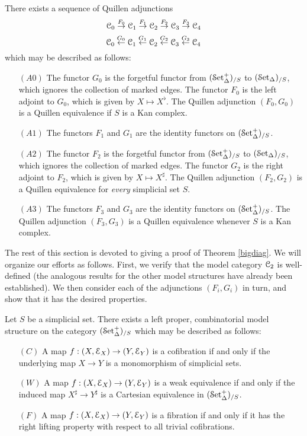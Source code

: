 \begin{theorem}\label{bigdiag}
There exists a sequence of Quillen adjunctions
$$ \operatorname{\mathcal{C}}_0 \stackrel{F_0}{\rightarrow} \operatorname{\mathcal{C}}_1 \stackrel{F_1}{\rightarrow} \operatorname{\mathcal{C}}_2
\stackrel{F_2}{\rightarrow} \operatorname{\mathcal{C}}_3 \stackrel{F_3}{\rightarrow} \operatorname{\mathcal{C}}_4$$
$$ \operatorname{\mathcal{C}}_0 \stackrel{G_0}{\leftarrow} \operatorname{\mathcal{C}}_1 \stackrel{G_1}{\leftarrow} \operatorname{\mathcal{C}}_2
\stackrel{G_2}{\leftarrow} \operatorname{\mathcal{C}}_3 \stackrel{G_3}{\leftarrow} \operatorname{\mathcal{C}}_4$$
which may be described as follows:
\begin{itemize}
\item[$(A0)$] The functor $G_0$ is the forgetful functor from $(\operatorname{\mathcal{S}et_{\Delta}^{+}})_{/S}$ to $(\operatorname{\mathcal{S}et_{\Delta}})_{/S}$, which
ignores the collection of marked edges. The functor $F_0$ is the left adjoint to $G_0$, which is given by
$X \mapsto X^{\flat}$. The Quillen adjunction $(F_0,G_0)$ is a Quillen equivalence if $S$ is a Kan complex.

\item[$(A1)$] The functors $F_1$ and $G_1$ are the identity functors on $(\operatorname{\mathcal{S}et_{\Delta}^{+}})_{/S}$.

\item[$(A2)$] The functor $F_2$ is the forgetful functor from $(\operatorname{\mathcal{S}et_{\Delta}^{+}})_{/S}$ to $(\operatorname{\mathcal{S}et_{\Delta}})_{/S}$, which ignores
the collection of marked edges. The functor $G_2$ is the right adjoint to $F_2$, which is given by
$X \mapsto X^{\sharp}$. The Quillen adjunction $(F_2,G_2)$ is a Quillen equivalence for
{\em every} simplicial set $S$.

\item[$(A3)$] The functors $F_3$ and $G_3$ are the identity functors on $(\operatorname{\mathcal{S}et_{\Delta}^{+}})_{/S}$. The Quillen
adjunction $(F_3, G_3)$ is a Quillen equivalence whenever $S$ is a Kan complex.
\end{itemize}
\end{theorem}

The rest of this section is devoted to giving a proof of Theorem \ref{bigdiag}. We will organize our efforts as follows. First, we verify that the model category $\operatorname{\mathcal{C}}_{2}$ is well-defined (the analogous results for the other model structures have already been established). We then consider each of the adjunctions $(F_i,G_i)$ in turn, and show that it has the desired properties.

\begin{proposition}\label{lmark}
Let $S$ be a simplicial set. There exists a left proper, combinatorial model structure on the category
$(\operatorname{\mathcal{S}et_{\Delta}^{+}})_{/S}$ which may be described as follows:
\begin{itemize}
\item[$(C)$] A map $f: (X, \operatorname{\mathcal{E}}_{X}) \rightarrow (Y, \operatorname{\mathcal{E}}_Y)$ is a cofibration if and only if the underlying map $X \rightarrow Y$ is a monomorphism of simplicial sets.
\item[$(W)$] A map $f: (X, \operatorname{\mathcal{E}}_{X}) \rightarrow (Y, \operatorname{\mathcal{E}}_{Y})$ is a weak equivalence
if and only if the induced map $X^{\sharp} \rightarrow Y^{\sharp}$ is a Cartesian equivalence
in $(\operatorname{\mathcal{S}et_{\Delta}^{+}})_{/S}$.
\item[$(F)$] A map $f: (X, \operatorname{\mathcal{E}}_{X}) \rightarrow (Y, \operatorname{\mathcal{E}}_Y)$ is a fibration if and only if
it has the right lifting property with respect to all trivial cofibrations.
\end{itemize}
\end{proposition}

